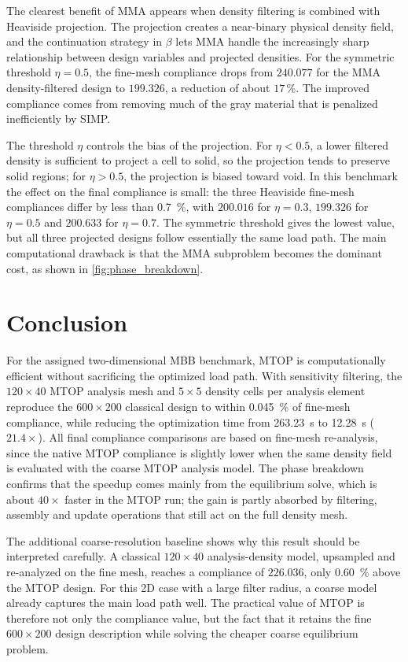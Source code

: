\documentclass[11pt,a4paper]{article}
\begin{document}
The clearest benefit of MMA appears when density filtering is combined with Heaviside projection. The projection creates a near-binary physical density field, and the continuation strategy in $\beta$ lets MMA handle the increasingly sharp relationship between design variables and projected densities. For the symmetric threshold $\eta=0.5$, the fine-mesh compliance drops from $240.077$ for the MMA density-filtered design to $199.326$, a reduction of about $17$\,\%. The improved compliance comes from removing much of the gray material that is penalized inefficiently by SIMP.

The threshold $\eta$ controls the bias of the projection. For $\eta<0.5$, a lower filtered density is sufficient to project a cell to solid, so the projection tends to preserve solid regions; for $\eta>0.5$, the projection is biased toward void. In this benchmark the effect on the final compliance is small: the three Heaviside fine-mesh compliances differ by less than \SI{0.7}{\percent}, with $200.016$ for $\eta=0.3$, $199.326$ for $\eta=0.5$ and $200.633$ for $\eta=0.7$. The symmetric threshold gives the lowest value, but all three projected designs follow essentially the same load path. The main computational drawback is that the MMA subproblem becomes the dominant cost, as shown in \cref{fig:phase_breakdown}.

\section{Conclusion}

For the assigned two-dimensional MBB benchmark, MTOP is computationally efficient without sacrificing the optimized load path. With sensitivity filtering, the $120\times 40$ MTOP analysis mesh and $5\times 5$ density cells per analysis element reproduce the $600\times 200$ classical design to within \SI{0.045}{\percent} of fine-mesh compliance, while reducing the optimization time from \SI{263.23}{\second} to \SI{12.28}{\second} ($21.4\times$). All final compliance comparisons are based on fine-mesh re-analysis, since the native MTOP compliance is slightly lower when the same density field is evaluated with the coarse MTOP analysis model. The phase breakdown confirms that the speedup comes mainly from the equilibrium solve, which is about $40\times$ faster in the MTOP run; the gain is partly absorbed by filtering, assembly and update operations that still act on the full density mesh.

The additional coarse-resolution baseline shows why this result should be interpreted carefully. A classical $120\times 40$ analysis-density model, upsampled and re-analyzed on the fine mesh, reaches a compliance of $226.036$, only \SI{0.60}{\percent} above the MTOP design. For this 2D case with a large filter radius, a coarse model already captures the main load path well. The practical value of MTOP is therefore not only the compliance value, but the fact that it retains the fine $600\times 200$ design description while solving the cheaper coarse equilibrium problem.
\end{document}
